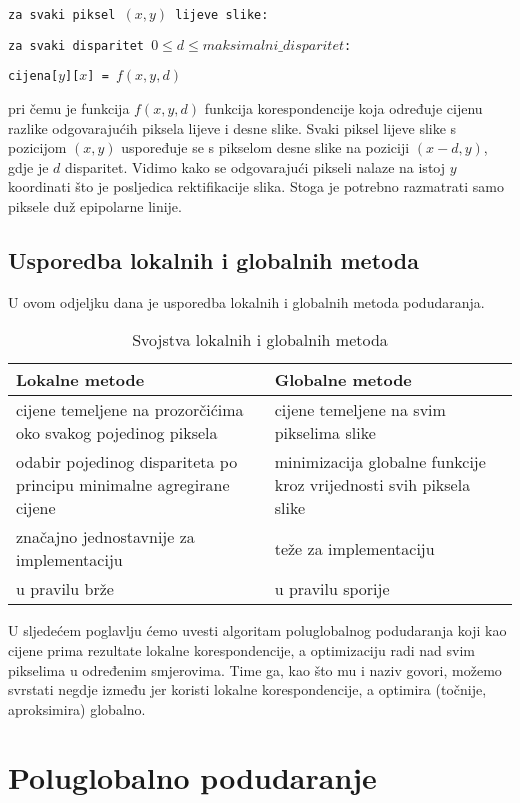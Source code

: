 \documentclass[utf8, zavrsni, numeric]{fer}
\begin{document}
{\tt za svaki piksel $(x, y)$ lijeve slike:}

{\quad \tt za svaki disparitet $0 \leq d \leq maksimalni\_ disparitet$:}

{\quad\quad \tt cijena[$y$][$x$] = $f(x, y, d)$}    


\noindent pri čemu je funkcija $f(x, y, d)$ funkcija korespondencije koja određuje cijenu razlike odgovarajućih piksela lijeve i desne slike. Svaki piksel lijeve slike s pozicijom $(x, y)$
uspoređuje se s pikselom desne slike na poziciji $(x - d, y)$, gdje je $d$ disparitet. Vidimo kako se odgovarajući pikseli nalaze na istoj $y$ koordinati što je posljedica rektifikacije slika.
Stoga je potrebno razmatrati samo piksele duž epipolarne linije.

\section{Usporedba lokalnih i globalnih metoda}
U ovom odjeljku dana je usporedba lokalnih i globalnih metoda podudaranja.

\begin{table}[htbp]
  \caption{Svojstva lokalnih i globalnih metoda}
  \label{tbl:usp_lok_glob}
  \centering
  \begin{tabularx}{\textwidth}{X|X} \hline
    {\bf Lokalne metode} & {\bf Globalne metode} \\
    \hline
    cijene temeljene na prozorčićima oko svakog pojedinog piksela & cijene temeljene na svim pikselima slike \\
    \hline
    odabir pojedinog dispariteta po principu minimalne agregirane cijene & minimizacija globalne funkcije kroz vrijednosti svih piksela slike \\
    \hline
    značajno jednostavnije za implementaciju & teže za implementaciju \\
    \hline
    u pravilu brže & u pravilu sporije
  \end{tabularx}
\end{table}

U sljedećem poglavlju ćemo uvesti algoritam poluglobalnog podudaranja koji kao cijene prima rezultate lokalne korespondencije, a optimizaciju radi nad svim
pikselima u određenim smjerovima. Time ga, kao što mu i naziv govori, možemo svrstati negdje između jer koristi lokalne korespondencije, a optimira (točnije, aproksimira) globalno.


\chapter{Poluglobalno podudaranje}
\end{document}
